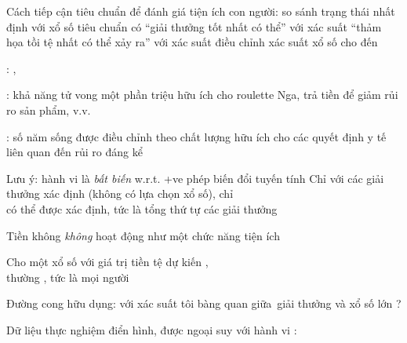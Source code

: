 \documentclass{article}
\begin{document}
\begin{huge}
Cách tiếp cận tiêu chuẩn để đánh giá tiện ích con người:\al
  so sánh trạng thái nhất định  với xổ số tiêu chuẩn   có \nl
    ``giải thưởng tốt nhất có thể'' \mat{$\ubest$} với xác suất \nl
    ``thảm họa tồi tệ nhất có thể xảy ra'' \mat{$\uworst$} với xác suất \al
  điều chỉnh xác suất xổ số  cho đến 

\vspace*{0.4in}

\textwidth
{}


: , 

: khả năng tử vong một phần triệu\al
  hữu ích cho roulette Nga, trả tiền để giảm rủi ro sản phẩm, v.v.

: số năm sống được điều chỉnh theo chất lượng\al
  hữu ích cho các quyết định y tế liên quan đến rủi ro đáng kể

Lưu ý: hành vi là \emph{bất biến} w.r.t. +ve phép biến đổi tuyến tính
\mat{\[
  U'(x) = k_1 U(x) + k_2 \quad\mbox{where } k_1 > 0
\]}
Chỉ với các giải thưởng xác định (không có lựa chọn xổ số), chỉ\\
 có thể được xác định, tức là tổng thứ tự các giải thưởng


Tiền không \emph{không} hoạt động như một chức năng tiện ích

Cho một xổ số  với giá trị tiền tệ dự kiến ,\\
thường , tức là mọi người 

Đường cong hữu dụng: với xác suất  tôi bàng quan giữa\
giải thưởng  và xổ số  lớn ?

Dữ liệu thực nghiệm điển hình, được ngoại suy với hành vi :

\vspace*{0.2in}

\textwidth
{}



\heading{Tiện ích nhóm sinh viên}


\end{huge}
\end{document}
